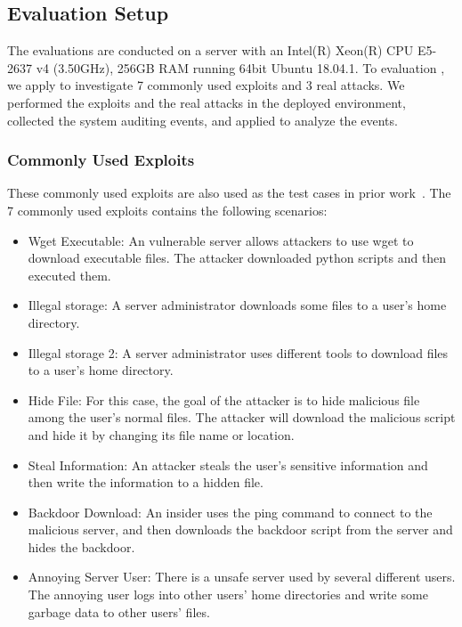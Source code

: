 
\subsection{Evaluation Setup}
\label{subsec:cases}
The evaluations are conducted on a server with an Intel(R) Xeon(R) CPU E5-2637 v4 (3.50GHz), 256GB RAM running 64bit Ubuntu 18.04.1.
To evaluation \tool, we apply \tool to investigate 7 commonly used exploits and 3 real attacks. We performed the exploits and the real attacks in the deployed environment, collected the system auditing events, and applied \tool to analyze the events.

\subsubsection{Commonly Used Exploits}
\label{subsub:benign-cases}
These commonly used exploits are also used as the test cases in prior work~\cite{exploitdb,liu2018priotracker,kwon2018mci,reduction}.
The 7 commonly used exploits contains the following scenarios:
\begin{itemize}[noitemsep, topsep=1pt, partopsep=1pt, listparindent=\parindent, leftmargin=*]
    \item Wget Executable: An vulnerable server allows attackers to use wget to download  executable files. The attacker downloaded python scripts and then executed them.
    \item Illegal storage: A server administrator downloads some files to a user's home directory.
    \item Illegal storage 2: A server administrator uses different tools to download files to a user's home directory.
    \item Hide File: For this case, the goal of the attacker is to hide malicious file among the user's normal files. The attacker will download the malicious script and hide it by changing its file name or location.
    \item Steal Information: An attacker steals the user's sensitive information and then write the information to a hidden file.
    \item Backdoor Download: An insider uses the ping command to connect to the malicious server, and then downloads the backdoor script from the server and hides the backdoor.
    \item Annoying Server User: There is a unsafe server used by several different users. The annoying user logs into other users' home directories and write some garbage data to other users' files. 
\end{itemize}


